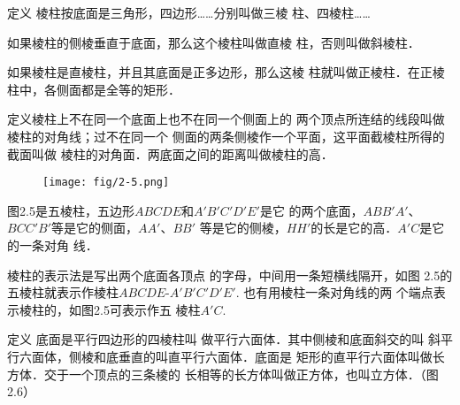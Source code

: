 \begin{blk}{定义}
    棱柱按底面是三角形，四边形……分别叫做三棱
柱、四棱柱……

如果棱柱的侧棱垂直于底面，那么这个棱柱叫做直棱
柱，否则叫做斜棱柱．

如果棱柱是直棱柱，并且其底面是正多边形，那么这棱
柱就叫做正棱柱．在正棱柱中，各侧面都是全等的矩形．
\end{blk}
 
\begin{blk}
    {定义}棱柱上不在同一个底面上也不在同一个侧面上的
两个顶点所连结的线段叫做棱柱的对角线；过不在同一个
侧面的两条侧棱作一个平面，这平面截棱柱所得的截面叫做
棱柱的对角面．两底面之间的距离叫做棱柱的高．
\end{blk}

\begin{figure}[htp]
    \centering
\texttt{[image: fig/2-5.png]}
    \caption{}
\end{figure}

图2.5是五棱柱，五边形$ABCDE$和$A'B'C'D'E'$是它
的两个底面，$ABB'A'$、$BCC'B'$等是它的侧面，$AA'$、$BB'$
等是它的侧棱，$HH'$的长是它的高．$A'C$是它的一条对角
线．

棱柱的表示法是写出两个底面各顶点
的字母，中间用一条短横线隔开，如图
2.5的五棱柱就表示作棱柱$ABCDE$-$A'
B'C'D'E'$. 也有用棱柱一条对角线的两
个端点表示棱柱的，如图2.5可表示作五
棱柱$A'C$. 

\begin{blk}{定义} 
    底面是平行四边形的四棱柱叫
    做平行六面体．其中侧棱和底面斜交的叫
    斜平行六面体，侧棱和底垂直的叫直平行六面体．底面是
    矩形的直平行六面体叫做长方体．交于一个顶点的三条棱的
    长相等的长方体叫做正方体，也叫立方体．（图2.6）
\end{blk}

